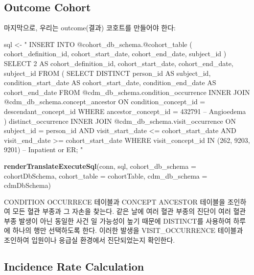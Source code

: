 \documentclass[11pt]{book}
\newenvironment{Shaded}{\begin{snugshade}}{\end{snugshade}}
\newcommand{\KeywordTok}[1]{\textcolor[rgb]{0.13,0.29,0.53}{\textbf{#1}}}
\newcommand{\DataTypeTok}[1]{\textcolor[rgb]{0.13,0.29,0.53}{#1}}
\newcommand{\StringTok}[1]{\textcolor[rgb]{0.31,0.60,0.02}{#1}}
\newcommand{\NormalTok}[1]{#1}
\theoremstyle{definition}
\theoremstyle{definition}
\theoremstyle{definition}
\theoremstyle{remark}
\begin{document}
\subsection{Outcome Cohort}\label{outcome-cohort}

마지막으로, 우리는 outcome(결과) 코호트를 만들어야 한다:

\begin{Shaded}
\begin{Highlighting}[]
\NormalTok{sql <-}\StringTok{ "}
\StringTok{INSERT INTO @cohort_db_schema.@cohort_table (}
\StringTok{ cohort_definition_id,}
\StringTok{ cohort_start_date,}
\StringTok{ cohort_end_date,}
\StringTok{subject_id}
\StringTok{)}
\StringTok{SELECT 2 AS cohort_definition_id,}
\StringTok{  cohort_start_date,}
\StringTok{  cohort_end_date,}
\StringTok{  subject_id}
\StringTok{FROM (}
\StringTok{  SELECT DISTINCT person_id AS subject_id,}
\StringTok{    condition_start_date AS cohort_start_date,}
\StringTok{    condition_end_date AS cohort_end_date}
\StringTok{  FROM @cdm_db_schema.condition_occurrence}
\StringTok{  INNER JOIN @cdm_db_schema.concept_ancestor}
\StringTok{    ON condition_concept_id = descendant_concept_id}
\StringTok{  WHERE ancestor_concept_id = 432791 -- Angioedema}
\StringTok{) distinct_occurrence}
\StringTok{INNER JOIN @cdm_db_schema.visit_occurrence}
\StringTok{  ON subject_id = person_id}
\StringTok{  AND visit_start_date <= cohort_start_date}
\StringTok{  AND visit_end_date >= cohort_start_date}
\StringTok{WHERE visit_concept_id IN (262, 9203,}
\StringTok{    9201) -- Inpatient or ER;}
\StringTok{"}

\KeywordTok{renderTranslateExecuteSql}\NormalTok{(conn, sql,}
                          \DataTypeTok{cohort_db_schema =}\NormalTok{ cohortDbSchema,}
                          \DataTypeTok{cohort_table =}\NormalTok{ cohortTable,}
                          \DataTypeTok{cdm_db_schema =}\NormalTok{ cdmDbSchema)}
\end{Highlighting}
\end{Shaded}

CONDITION OCCURRECE 테이블과 CONCEPT ANCESTOR 테이블을 조인하여 모든
혈관 부종과 그 자손을 찾는다. 같은 날에 여러 혈관 부종의 진단이 여러
혈관 부종 발생이 아닌 동일한 사건 일 가능성이 높기 때문에 DISTINCT를
사용하여 하루에 하나의 행만 선택하도록 한다. 이러한 발생을
VISIT\_OCCURRENCE 테이블과 조인하여 입원이나 응급실 환경에서
진단되었는지 확인한다.

\subsection{Incidence Rate
Calculation}\label{incidence-rate-calculation}
\end{document}
